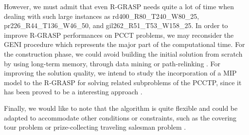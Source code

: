 \documentclass{ro}
\begin{document}
However, we must admit that even R-GRASP needs quite a lot of time when dealing with such large instances as rd400\_R80\_T240\_W80\_25, pr226\_R44\_T136\_W46\_50, and gil262\_R51\_T53\_W158\_25. In order to improve R-GRASP performances on PCCT problems, we may reconsider the GENI procedure which represents the major part of the computational time. For the construction phase, we could avoid building the initial solution from scratch by using long-term memory, through data mining or path-relinking \cite{santana2020improving}. For improving the solution quality, we intend to study the incorporation of a MIP model to the R-GRASP for solving related subproblems of the PCCTP, since it has been proved to be a interesting approach \cite{climaco2019combining, al2020practical, almeder2010hybrid}.




Finally, we would like to note that the algorithm is quite flexible and could be adapted to accommodate other conditions or constraints, such as the covering tour problem \cite{current1989covering} or prize-collecting traveling salesman problem \cite{berube2009branch}.







\end{document}
